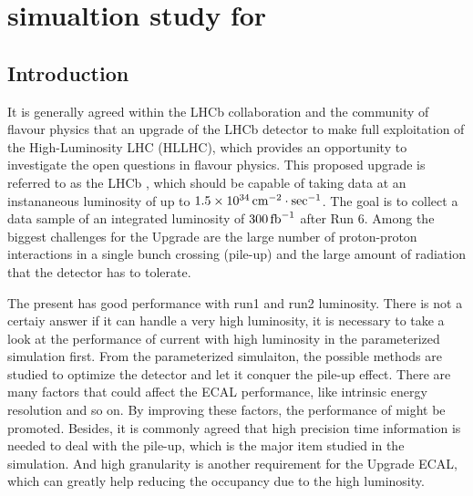 \chapter{\ecal simualtion study for \upgradetwo}
\label{chap:ecal}

\section{Introduction}
\label{sec:Introduction}

It is generally agreed within the LHCb collaboration 
and the community of flavour physics that an upgrade of the LHCb detector to make full exploitation of the High-Luminosity LHC (HLLHC), 
which provides an opportunity to investigate the open questions in flavour physics\supercite{LHCb-PII-EoI,LHCb-PII-Physics,Strategy:2019vxc}. 
This proposed upgrade is referred to as the LHCb \upgradetwo, 
which should be capable of taking data at an instananeous luminosity of up to $1.5\times10^{34}\text{\,cm}^{-2}\cdot\mathrm{sec}^{-1}$. 
The goal is to collect a data sample of an integrated luminosity of $300\text{\,fb}^{-1}$ after Run 6\supercite{LHCb-PII-EoI}.
Among the biggest challenges for the Upgrade are the large number of proton-proton interactions in a single bunch crossing (pile-up) 
and the large amount of radiation that the detector has to tolerate. 

The present \ecal has good performance with run1 and run2 luminosity. 
There is not a certaiy answer if it can handle a very high luminosity, 
it is necessary to take a look at the performance of current \ecal with high luminosity in the parameterized simulation first. 
From the parameterized simulaiton,
the possible methods are studied to optimize the detector and let it conquer the pile-up effect.
There are many factors that could affect the ECAL performance, 
like intrinsic energy resolution and so on.
By improving these factors, 
the performance of \ecal might be promoted.
Besides,
it is commonly agreed that high precision time information is needed to deal with the pile-up,
which is the major item studied in the simulation.
And high granularity is another requirement for the Upgrade ECAL, 
which can greatly help reducing the occupancy due to the high luminosity.

